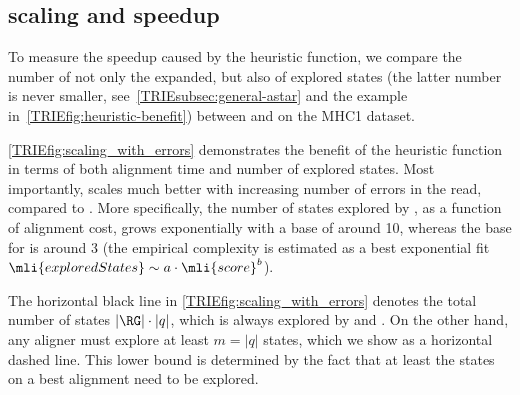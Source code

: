 \subsection{\A scaling and speedup}
To measure the speedup caused by the heuristic function, we compare the number
of not only the expanded, but also of explored states (the latter number is
never smaller, see~\cref{TRIEsubsec:general-astar} and the example
in~\cref{TRIEfig:heuristic-benefit}) between \astarix and \dijkstra on the MHC1
dataset.

\cref{TRIEfig:scaling_with_errors} demonstrates the benefit of the heuristic
function in terms of both alignment time and number of explored states. Most
importantly, \astarix scales much better with increasing number of errors in the
read, compared to \dijkstra. More specifically, the number of states explored by
\dijkstra, as a function of alignment cost, grows exponentially with a base of 
around 10, whereas the base for \astarix is around 3 (the empirical complexity is
estimated as a best exponential fit \mbox{$\mli{exploredStates} \sim a \cdot
\mli{score}^b$}).

The horizontal black line in \cref{TRIEfig:scaling_with_errors} denotes the total
number of states $\lvert \RG \rvert \cdot \lvert q \rvert$, which is always
explored by \bitparallel and \pasgal. On the other hand, any aligner must
explore at least $m = \lvert q \rvert$ states, which we show as a horizontal
dashed line. This lower bound is determined by the fact that at least the states
on a best alignment need to be explored.


